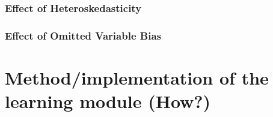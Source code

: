 \documentclass{article}
\begin{document}

\subsubsection{Effect of Heteroskedasticity}


\subsubsection{Effect of Omitted Variable Bias}






\section{Method/implementation of the learning module (How?)}







	
\end{document}
